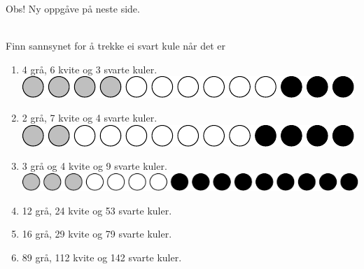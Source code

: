\documentclass[english,hidelinks,pdftex, 11 pt, class=report,crop=false]{standalone}
\begin{document}
Obs! Ny oppgåve på neste side.

\\[10pt]
Finn sannsynet for å trekke ei svart kule når det er
\begin{enumerate}[label=\alph*)]
	\item 4 grå, 6 kvite og 3 svarte kuler.\\
	\includegraphics[]{sanopg2a}
	\item 2 grå, 7 kvite og 4 svarte kuler.\\
	\includegraphics[]{sanopg2b}
	\item 3 grå og 4 kvite og 9 svarte kuler.\\
	\includegraphics[]{sanopg2c}
	\item 12 grå, 24 kvite og 53 svarte kuler.
	\item 16 grå, 29 kvite og 79 svarte kuler.
	\item 89 grå, 112 kvite og 142 svarte kuler.	
\end{enumerate}
\end{document}
